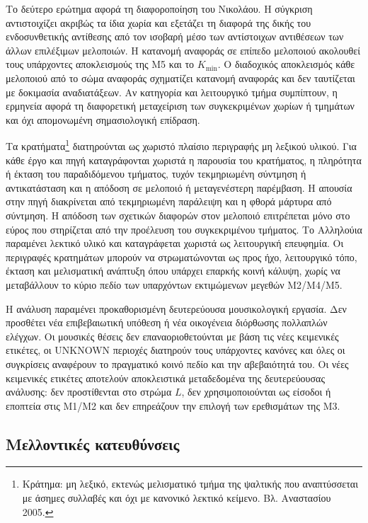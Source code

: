 \documentclass[11pt,a4paper]{article}
\begin{document}
Το δεύτερο ερώτημα αφορά τη διαφοροποίηση του Νικολάου. Η σύγκριση αντιστοιχίζει ακριβώς τα ίδια χωρία και εξετάζει τη διαφορά της δικής του ενδοσυνθετικής αντίθεσης από τον ισοβαρή μέσο των αντίστοιχων αντιθέσεων των άλλων επιλέξιμων μελοποιών. Η κατανομή αναφοράς σε επίπεδο μελοποιού ακολουθεί τους υπάρχοντες αποκλεισμούς της M5 και το $K_{\min}$. Ο διαδοχικός αποκλεισμός κάθε μελοποιού από το σώμα αναφοράς σχηματίζει κατανομή αναφοράς και δεν ταυτίζεται με δοκιμασία αναδιατάξεων. Αν κατηγορία και λειτουργικό τμήμα συμπίπτουν, η ερμηνεία αφορά τη διαφορετική μεταχείριση των συγκεκριμένων χωρίων ή τμημάτων και όχι απομονωμένη σημασιολογική επίδραση.

Τα κρατήματα\footnote{Κράτημα: μη λεξικό, εκτενώς μελισματικό τμήμα της ψαλτικής που αναπτύσσεται με άσημες συλλαβές και όχι με κανονικό λεκτικό κείμενο. Βλ. Αναστασίου 2005.} διατηρούνται ως χωριστό πλαίσιο περιγραφής μη λεξικού υλικού. Για κάθε έργο και πηγή καταγράφονται χωριστά η παρουσία του κρατήματος, η πληρότητα ή έκταση του παραδιδόμενου τμήματος, τυχόν τεκμηριωμένη σύντμηση ή αντικατάσταση και η απόδοση σε μελοποιό ή μεταγενέστερη παρέμβαση. Η απουσία στην πηγή διακρίνεται από τεκμηριωμένη παράλειψη και η φθορά μάρτυρα από σύντμηση. Η απόδοση των σχετικών διαφορών στον μελοποιό επιτρέπεται μόνο στο εύρος που στηρίζεται από την προέλευση του συγκεκριμένου τμήματος. Το Αλληλούια παραμένει λεκτικό υλικό και καταγράφεται χωριστά ως λειτουργική επευφημία. Οι περιγραφές κρατημάτων μπορούν να στρωματώνονται ως προς ήχο, λειτουργικό τόπο, έκταση και μελισματική ανάπτυξη όπου υπάρχει επαρκής κοινή κάλυψη, χωρίς να μεταβάλλουν το κύριο πεδίο των υπαρχόντων εκτιμώμενων μεγεθών M2/M4/M5.

Η ανάλυση παραμένει προκαθορισμένη δευτερεύουσα μουσικολογική εργασία. Δεν προσθέτει νέα επιβεβαιωτική υπόθεση ή νέα οικογένεια διόρθωσης πολλαπλών ελέγχων. Οι μουσικές θέσεις δεν επαναοριοθετούνται με βάση τις νέες κειμενικές ετικέτες, οι UNKNOWN περιοχές διατηρούν τους υπάρχοντες κανόνες και όλες οι συγκρίσεις αναφέρουν το πραγματικό κοινό πεδίο και την αβεβαιότητά του. Οι νέες κειμενικές ετικέτες αποτελούν αποκλειστικά μεταδεδομένα της δευτερεύουσας ανάλυσης: δεν προστίθενται στο στρώμα $L$, δεν χρησιμοποιούνται ως είσοδοι ή εποπτεία στις M1/M2 και δεν επηρεάζουν την επιλογή των ερεθισμάτων της M3.


\subsection{Μελλοντικές κατευθύνσεις}
\end{document}
